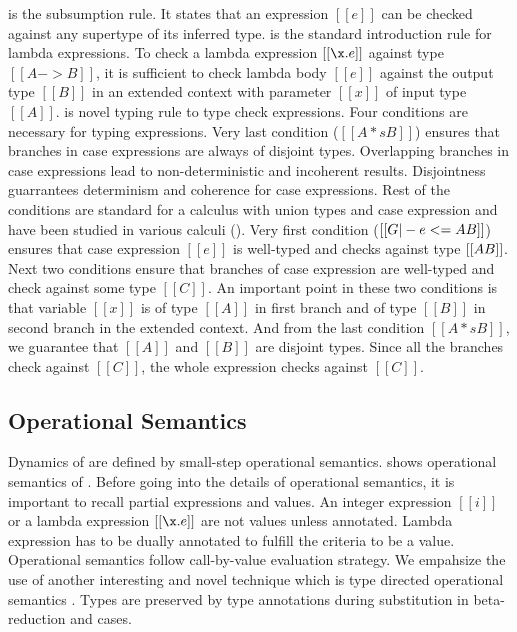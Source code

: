  is the subsumption rule. It states that an expression $[[e]]$ can be checked
against any supertype of its inferred type.
 is the standard introduction rule for lambda expressions. To check a
lambda expression $[[\x.e]]$ against type $[[A -> B]]$, it is sufficient to check lambda body $[[e]]$
against the output type $[[B]]$ in an extended context with parameter $[[x]]$ of input type $[[A]]$.
 is novel typing rule to type check \typeof expressions. Four conditions are necessary
for typing \typeof expressions. Very last condition ($[[A *s B]]$) ensures that branches in case
expressions are always of disjoint types. Overlapping branches in case expressions lead to non-deterministic
and incoherent results. Disjointness guarrantees determinism and coherence for case expressions.
Rest of the conditions are standard for a calculus with union types and case expression and have been
studied in various calculi ().
Very first condition ($[[G |- e <= A \/ B]]$) ensures that case expression $[[e]]$ is well-typed and checks
against type $[[A \/ B]]$.
Next two conditions ensure that branches of case expression are well-typed and check against some
type $[[C]]$. An important point in these two conditions is that variable $[[x]]$ is of type $[[A]]$
in first branch and of type $[[B]]$ in second branch in the extended context.
And from the last condition $[[A *s B]]$, we guarantee that $[[A]]$ and $[[B]]$ are disjoint types.
Since all the branches check against $[[C]]$, the whole \typeof expression checks against $[[C]]$.

\begin{comment}
\begin{figure}[t]
  \begin{small}
    \centering
    \drules[typ]{$ [[G |- e dirflag A]] $}{Bidirectional Typing}{int, var, ann, app, sub, abs, typeof}
  \end{small}
  \caption{Typing for \cal.}
  \label{fig:union:typ}
\end{figure}
\end{comment}

\subsection{Operational Semantics}
\label{sec:union:os}
Dynamics of \cal are defined by small-step operational semantics.
 shows
operational semantics of \cal. Before going into the details of operational semantics, it is important
to recall partial expressions and values. An integer expression $[[i]]$ or a lambda expression $[[\x.e]]$
are not values unless annotated. Lambda expression has to be dually annotated to fulfill the criteria to
be a value. Operational semantics follow call-by-value evaluation strategy.
We empahsize the use of another interesting and novel technique which is type directed operational
semantics . Types are preserved by type annotations during substitution
in beta-reduction and \typeof cases.

